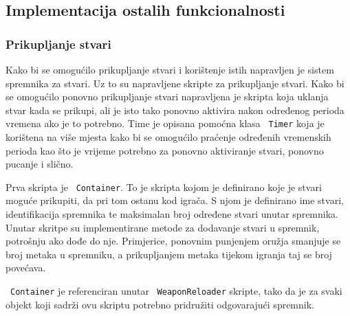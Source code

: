 \subsection{Implementacija ostalih funkcionalnosti}
\subsubsection*{Prikupljanje stvari}
Kako bi se omogućilo prikupljanje stvari i korištenje istih napravljen je sistem
spremnika za stvari. Uz to su napravljene skripte za prikupljanje stvari. Kako bi se
omogućilo ponovno prikupljanje stvari napravljena je skripta koja uklanja stvar kada
se prikupi, ali je isto tako ponovno aktivira nakon određenog perioda vremena ako je
to potrebno. Time je opisana pomoćna klasa ~\texttt{Timer} koja je korištena na više mjesta
kako bi se omogućilo praćenje određenih vremenskih perioda kao što je vrijeme
potrebno za ponovno aktiviranje stvari, ponovno pucanje i slično.

Prva skripta je ~\texttt{Container}. To je skripta kojom je definirano koje je stvari moguće
prikupiti, da pri tom ostanu kod igrača. S njom je definirano ime stvari,
identifikacija spremnika te maksimalan broj određene stvari unutar spremnika. Unutar
skritpe su implementirane metode za dodavanje stvari u spremnik, potrošnju ako dođe
do nje. Primjerice, ponovnim punjenjem oružja smanjuje se broj metaka u spremniku, a
prikupljanjem metaka tijekom igranja taj se broj povećava. 

~\texttt{Container} je referenciran unutar ~\texttt{WeaponReloader} skripte, tako da je za svaki objekt
koji sadrži ovu skriptu potrebno pridružiti odgovarajući spremnik. 


